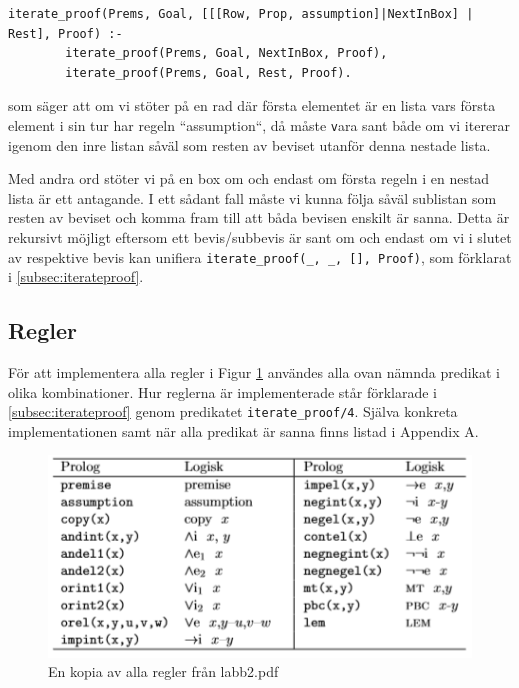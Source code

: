 \documentclass[a4paper]{article}
\begin{document}
\begin{verbatim}
iterate_proof(Prems, Goal, [[[Row, Prop, assumption]|NextInBox] | Rest], Proof) :-
        iterate_proof(Prems, Goal, NextInBox, Proof),
        iterate_proof(Prems, Goal, Rest, Proof).
\end{verbatim}
som säger att om vi stöter på en rad där första elementet är en lista vars första element i sin tur har regeln ``assumption``, då måste \texttt vara sant både om vi itererar igenom den inre listan såväl som resten av beviset utanför denna nestade lista. 

Med andra ord stöter vi på en box om och endast om första regeln i en nestad lista är ett antagande. I ett sådant fall måste vi kunna följa såväl sublistan som resten av beviset och komma fram till att båda bevisen enskilt är sanna. Detta är rekursivt möjligt eftersom ett bevis/subbevis är sant om och endast om vi i slutet av respektive bevis kan unifiera \texttt{iterate_proof(_, _, [], Proof)}, som förklarat i \ref{subsec:iterateproof}.

\subsection{Regler}
För att implementera alla regler i Figur \ref{fig:ruletable} användes alla ovan nämnda predikat i olika kombinationer. Hur reglerna är implementerade står förklarade i \ref{subsec:iterateproof} genom predikatet \texttt{iterate_proof/4}. Själva konkreta implementationen samt när alla predikat är sanna finns listad i Appendix A.

\begin{figure}[!h]
  \includegraphics[]{ruletable.png}
  \caption{En kopia av alla regler från labb2.pdf}
  \label{fig:ruletable}
\end{figure}
\end{document}
